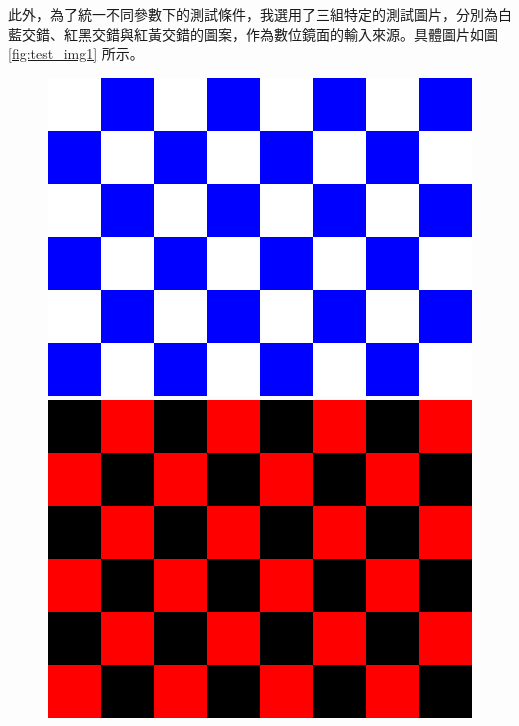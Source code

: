 \documentclass[12pt]{article}
\begin{document}
此外，為了統一不同參數下的測試條件，我選用了三組特定的測試圖片，分別為白藍交錯、紅黑交錯與紅黃交錯的圖案，作為數位鏡面的輸入來源。具體圖片如圖\ref{fig:test_img1} 所示。

\begin{figure}[htbp]
  \centering
  \begin{minipage}[b]{0.3\textwidth}
    \centering
    \includegraphics[width=\textwidth]{img/blank_blue.png}
  \end{minipage}
  \hfill
  \begin{minipage}[b]{0.3\textwidth}
    \centering
    \includegraphics[width=\textwidth]{img/blank_red.png}
  \end{minipage}
  \hfill
  \begin{minipage}[b]{0.3\textwidth}

\end{minipage}
\end{figure}
\end{document}
